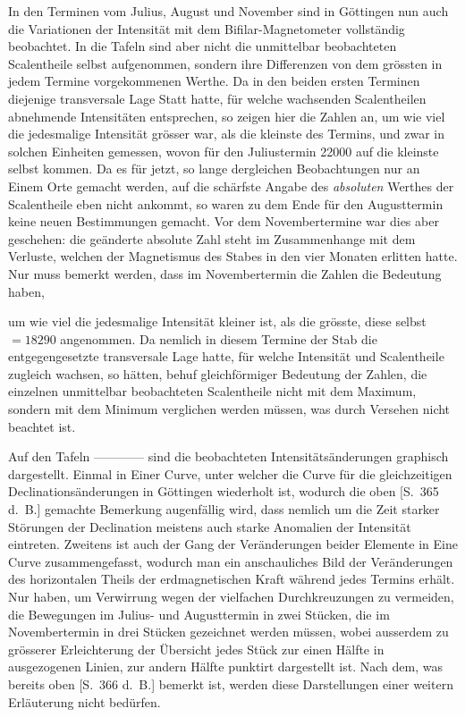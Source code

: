 In den Terminen vom Julius, August und November sind in Göttingen nun auch die Variationen der Intensität mit dem Bifilar-Magnetometer vollständig beobachtet. In die Tafeln sind aber nicht die unmittelbar beobachteten Scalentheile selbst aufgenommen, sondern ihre Differenzen von dem grössten in jedem Termine vorgekommenen Werthe. Da in den beiden ersten Terminen diejenige transversale Lage Statt hatte, für welche wachsenden Scalentheilen abnehmende Intensitäten entsprechen, so zeigen hier die Zahlen an, um wie viel die jedesmalige Intensität grösser war, als die kleinste des Termins, und zwar in solchen Einheiten gemessen, wovon für den Juliustermin 22000 auf die kleinste selbst kommen. Da es für jetzt, so lange dergleichen Beobachtungen nur an Einem Orte gemacht werden, auf die schärfste Angabe des \textit{absoluten} Werthes der Scalentheile eben nicht ankommt, so waren zu dem Ende für den Augusttermin keine neuen Bestimmungen gemacht. Vor dem Novembertermine war dies aber geschehen: die geänderte absolute Zahl steht im Zusammenhange mit dem Verluste, welchen der Magnetismus des Stabes in den vier Monaten erlitten hatte. Nur muss bemerkt werden, dass im Novembertermin die Zahlen die Bedeutung haben,\par
{}
\clearpage
\endgroup
{}
\noindent um wie viel die jedesmalige Intensität kleiner ist, als die grösste, diese selbst $=18290$ angenommen. Da nemlich in diesem Termine der Stab die entgegengesetzte transversale Lage hatte, für welche Intensität und Scalentheile zugleich wachsen, so hätten, behuf gleichförmiger Bedeutung der Zahlen, die einzelnen unmittelbar beobachteten Scalentheile nicht mit dem Maximum, sondern mit dem Minimum verglichen werden müssen, was durch Versehen nicht beachtet ist.

Auf den Tafeln ---\quad---\quad---\quad--- sind die beobachteten Intensitätsänderungen graphisch dargestellt. Einmal in Einer Curve, unter welcher die Curve für die gleichzeitigen Declinationsänderungen in Göttingen wiederholt ist, wodurch die oben [S.\ 365 d.\ B.] gemachte Bemerkung augenfällig wird, dass nemlich um die Zeit starker Störungen der Declination meistens auch starke Anomalien der Intensität eintreten. Zweitens ist auch der Gang der Veränderungen beider Elemente in Eine Curve zusammengefasst, wodurch man ein anschauliches Bild der Veränderungen des horizontalen Theils der erdmagnetischen Kraft während jedes Termins erhält. Nur haben, um Verwirrung wegen der vielfachen Durchkreuzungen zu vermeiden, die Bewegungen im Julius- und Augusttermin in zwei Stücken, die im Novembertermin in drei Stücken gezeichnet werden müssen, wobei ausserdem zu grösserer Erleichterung der Übersicht jedes Stück zur einen Hälfte in ausgezogenen Linien, zur andern Hälfte punktirt dargestellt ist. Nach dem, was bereits oben [S.\ 366 d.\ B.] bemerkt ist, werden diese Darstellungen einer weitern Erläuterung nicht bedürfen.

